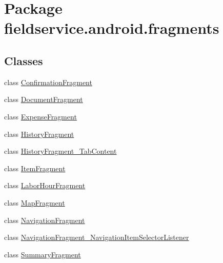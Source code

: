 \hypertarget{namespacefieldservice_1_1android_1_1fragments}{\section{Package fieldservice.\+android.\+fragments}
\label{namespacefieldservice_1_1android_1_1fragments}
}
\subsection*{Classes}
\begin{DoxyCompactItemize}
\item 
class \hyperlink{classfieldservice_1_1android_1_1fragments_1_1_confirmation_fragment}{Confirmation\+Fragment}
\item 
class \hyperlink{classfieldservice_1_1android_1_1fragments_1_1_document_fragment}{Document\+Fragment}
\item 
class \hyperlink{classfieldservice_1_1android_1_1fragments_1_1_expense_fragment}{Expense\+Fragment}
\item 
class \hyperlink{classfieldservice_1_1android_1_1fragments_1_1_history_fragment}{History\+Fragment}
\item 
class \hyperlink{classfieldservice_1_1android_1_1fragments_1_1_history_fragment___tab_content}{History\+Fragment\+\_\+\+Tab\+Content}
\item 
class \hyperlink{classfieldservice_1_1android_1_1fragments_1_1_item_fragment}{Item\+Fragment}
\item 
class \hyperlink{classfieldservice_1_1android_1_1fragments_1_1_labor_hour_fragment}{Labor\+Hour\+Fragment}
\item 
class \hyperlink{classfieldservice_1_1android_1_1fragments_1_1_map_fragment}{Map\+Fragment}
\item 
class \hyperlink{classfieldservice_1_1android_1_1fragments_1_1_navigation_fragment}{Navigation\+Fragment}
\item 
class \hyperlink{classfieldservice_1_1android_1_1fragments_1_1_navigation_fragment___navigation_item_selector_listener}{Navigation\+Fragment\+\_\+\+Navigation\+Item\+Selector\+Listener}
\item 
class \hyperlink{classfieldservice_1_1android_1_1fragments_1_1_summary_fragment}{Summary\+Fragment}
\end{DoxyCompactItemize}
